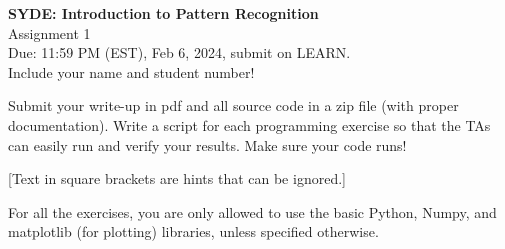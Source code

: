 \documentclass[10pt,letter,notitlepage]{article}
\newcommand{\red}[1]{{\color{red}#1}}
\newcounter{exercise}
\begin{document}
\begin{center}
  \large{\textbf{SYDE: Introduction to Pattern Recognition} \\ Assignment 1\\ \red{Due: 11:59 PM (EST), Feb 6, 2024}, submit on LEARN.} \\

Include your name and student number!

\end{center}

\begin{center}
Submit your write-up in pdf and all source code in a zip file (with proper documentation). Write a script for each programming exercise so that the TAs can easily run and verify your results. Make sure your code runs!

[Text in square brackets are hints that can be ignored.]
\end{center}

\noindent \red{NOTE} For all the exercises, you are only allowed to use the basic Python, Numpy, and matplotlib (for plotting) libraries, unless specified otherwise.
\end{document}
